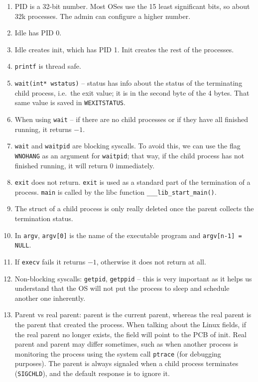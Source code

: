 \documentclass[12pt,a4paper]{article}
\begin{document}
\begin{enumerate}
  \item PID is a 32-bit number. Most OSes use the 15 least significant bits, so about 32k processes. The admin can configure a higher number.
  \item Idle has PID 0.
  \item Idle creates init, which has PID 1. Init creates the rest of the processes.
  \item \texttt{printf} is thread safe.
  \item \texttt{wait(int* wstatus)} -- status has info about the status of the terminating child process, i.e.\ the exit value; it is in the second byte of the 4 bytes. That same value is saved in \texttt{WEXITSTATUS}.
  \item When using \texttt{wait} -- if there are no child processes or if they have all finished running, it returns $-1$.
  \item \texttt{wait} and \texttt{waitpid} are blocking syscalls. To avoid this, we can use the flag \texttt{WNOHANG} as an argument for \texttt{waitpid}; that way, if the child process has not finished running, it will return 0 immediately.
  \item \texttt{exit} does not return. \texttt{exit} is used as a standard part of the termination of a process. \texttt{main} is called by the libc function \texttt{\_\_\_lib\_start\_main()}.
  \item The struct of a child process is only really deleted once the parent collects the termination status.
  \item In \texttt{argv}, \texttt{argv[0]} is the name of the executable program and \texttt{argv[n-1] = NULL}.
  \item If \texttt{execv} fails it returns $-1$, otherwise it does not return at all.
  \item Non-blocking syscalls: \texttt{getpid}, \texttt{getppid} -- this is very important as it helps us understand that the OS will not put the process to sleep and schedule another one inherently.
  \item Parent vs real parent: parent is the current parent, whereas the real parent is the parent that created the process. When talking about the Linux fields, if the real parent no longer exists, the field will point to the PCB of init. Real parent and parent may differ sometimes, such as when another process is monitoring the process using the system call \texttt{ptrace} (for debugging purposes). The parent is always signaled when a child process terminates (\texttt{SIGCHLD}), and the default response is to ignore it.

\end{enumerate}
\end{document}
